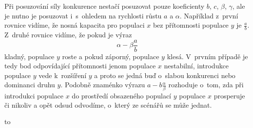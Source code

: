 \documentclass{article}
\begin{document}
\begin{multicols}
Při posuzování síly konkurence nestačí posuzovat pouze koeficienty
$b$, $c$, $\beta$, $\gamma$, ale je nutno je posuzovat i s ohledem na
rychlosti růstu $a$ a $\alpha$. Například z první rovnice vidíme, že
nosná kapacita pro populaci $x$ bez přítomnosti populace $y$ je
$\frac ab$. Z druhé rovnice vidíme, že pokud je výraz
$$\alpha - \beta \frac ab$$ kladný, populace $y$ roste a pokud záporný,
populace $y$ klesá. V prvním případě je tedy bod odpovídající
přítomnosti jenom populace $x$ nestabilní, introdukce populace $y$
vede k rozšíření $y$ a proto se jedná buď o slabou konkurenci nebo
dominanci druhu $y$. Podobně znaménko výrazu $a-b\frac\alpha\beta$
rozhoduje o tom, zda při introdukci populace $x$ do prostředí
obsazeného populací $y$ populace $x$ prosperuje či nikoliv a opět
odsud odvodíme, o který ze scénářů se může jednat.

\end{multicols}

\hbox to 
\end{document}
